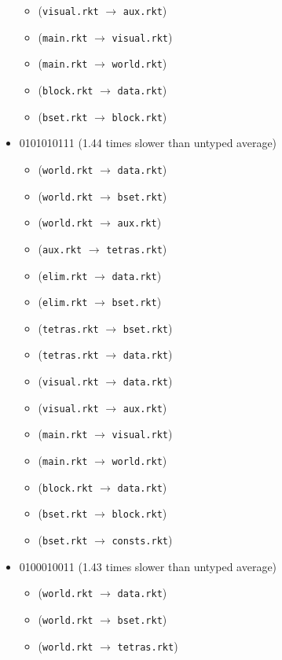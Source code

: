 \documentclass{article}
\newcommand{\mono}[1]{\texttt{#1}}
\begin{document}
\begin{itemize}
\begin{itemize}
  \item (\mono{visual.rkt} $\rightarrow$ \mono{aux.rkt})
  \item (\mono{main.rkt} $\rightarrow$ \mono{visual.rkt})
  \item (\mono{main.rkt} $\rightarrow$ \mono{world.rkt})
  \item (\mono{block.rkt} $\rightarrow$ \mono{data.rkt})
  \item (\mono{bset.rkt} $\rightarrow$ \mono{block.rkt})
  \end{itemize}
\item 0101010111 (1.44 times slower than untyped average)
  \begin{itemize}
  \item (\mono{world.rkt} $\rightarrow$ \mono{data.rkt})
  \item (\mono{world.rkt} $\rightarrow$ \mono{bset.rkt})
  \item (\mono{world.rkt} $\rightarrow$ \mono{aux.rkt})
  \item (\mono{aux.rkt} $\rightarrow$ \mono{tetras.rkt})
  \item (\mono{elim.rkt} $\rightarrow$ \mono{data.rkt})
  \item (\mono{elim.rkt} $\rightarrow$ \mono{bset.rkt})
  \item (\mono{tetras.rkt} $\rightarrow$ \mono{bset.rkt})
  \item (\mono{tetras.rkt} $\rightarrow$ \mono{data.rkt})
  \item (\mono{visual.rkt} $\rightarrow$ \mono{data.rkt})
  \item (\mono{visual.rkt} $\rightarrow$ \mono{aux.rkt})
  \item (\mono{main.rkt} $\rightarrow$ \mono{visual.rkt})
  \item (\mono{main.rkt} $\rightarrow$ \mono{world.rkt})
  \item (\mono{block.rkt} $\rightarrow$ \mono{data.rkt})
  \item (\mono{bset.rkt} $\rightarrow$ \mono{block.rkt})
  \item (\mono{bset.rkt} $\rightarrow$ \mono{consts.rkt})
  \end{itemize}
\item 0100010011 (1.43 times slower than untyped average)
  \begin{itemize}
  \item (\mono{world.rkt} $\rightarrow$ \mono{data.rkt})
  \item (\mono{world.rkt} $\rightarrow$ \mono{bset.rkt})
  \item (\mono{world.rkt} $\rightarrow$ \mono{tetras.rkt})

\end{itemize}
\end{itemize}
\end{document}
